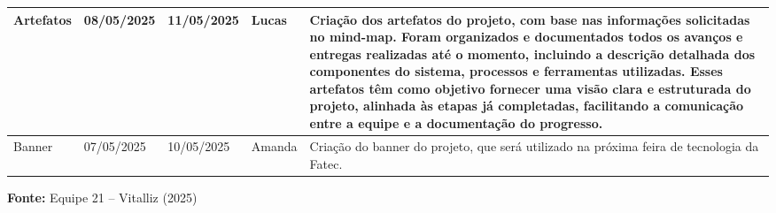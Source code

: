 \begin{center}
\begin{adjustbox}{max width=\textwidth}
\begin{tabular}{|m{4cm}|m{2.2cm}|m{2.2cm}|m{3cm}|m{8cm}|}
Artefatos & 08/05/2025 & 11/05/2025 & Lucas &
Criação dos artefatos do projeto, com base nas informações solicitadas no mind-map. Foram organizados e documentados todos os avanços e entregas realizadas até o momento, incluindo a descrição detalhada dos componentes do sistema, processos e ferramentas utilizadas. Esses artefatos têm como objetivo fornecer uma visão clara e estruturada do projeto, alinhada às etapas já completadas, facilitando a comunicação entre a equipe e a documentação do progresso. \\ \hline

Banner & 07/05/2025 & 10/05/2025 & Amanda &
Criação do banner do projeto, que será utilizado na próxima feira de tecnologia da Fatec. \\ \hline

\end{tabular}
\end{adjustbox}

\vspace{0.3em}
\small{\textbf{Fonte:} Equipe 21 – Vitalliz (2025)}

\end{center}
\medskip

